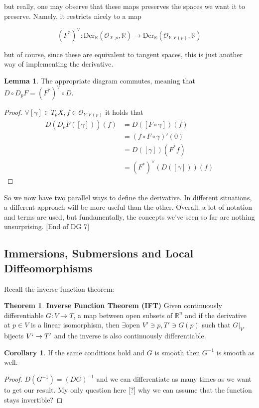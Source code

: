 \documentclass{article}
\theoremstyle{definition}
\newtheorem{theorem}{Theorem}
\newtheorem{corollary}{Corollary}
\newtheorem{lemma}{Lemma}
\begin{document}
but really, one may observe that these maps preserves the spaces we want it to
preserve. Namely, it restricts nicely to a map

$$ (F^*)^\vee : \text{Der}_\mathbb{R}(\mathcal{O}_{X, p}, \mathbb{R}) \to
\text{Der}_\mathbb{R}(\mathcal{O}_{Y, F(p)}, \mathbb{R}) $$

but of course, since these are equivalent to tangent spaces, this is just
another way of implementing the derivative. 

\begin{lemma}
The appropriate diagram commutes, meaning that $D \circ D_pF = (F^*)^\vee \circ D$.
\end{lemma}
\begin{proof}
$\forall [\gamma] \in T_pX, f \in \mathcal{O}_{Y, F(p)}$ it holds that
\begin{align*}
D(D_pF([\gamma]))(f) 
&= D([F \circ \gamma])(f) \\
&= (f \circ F \circ \gamma)'(0) \\
&= D([\gamma])(F^*f) \\
&= (F^*)^\vee (D([\gamma]))(f)
\end{align*}
\end{proof}

So we now have two parallel ways to define the derivative. In different
situations, a different approach will be more useful than the other. Overall, a
lot of notation and terms are used, but fundamentally, the concepts we've seen
so far are nothing unsurprising. [End of DG 7]

\subsection{Immersions, Submersions and Local Diffeomorphisms}

Recall the inverse function theorem:

\begin{theorem}
  \textbf{Inverse Function Theorem (IFT)} Given continuously differentiable $G :
  V \to T$, a map between open subsets of $\mathbb{R}^n$ and if the derivative
  at $p \in V$ is a linear isomorphism, then $\exists \text{open } V' \ni p, T'
  \ni G(p)$ such that $G |_{V'}$ bijects $V` \to T'$ and the inverse is also
  continuously differentiable.
\end{theorem}

\begin{corollary}
  If the same conditions hold and $G$ is smooth then $G^{-1}$ is smooth as well.
\end{corollary}
\begin{proof}
  $D(G^{-1}) = (DG)^{-1}$ and we can differentiate as many times as we want to
  get our result. My only question here [?] why we can assume that the function
  stays invertible?
\end{proof}
\end{document}
